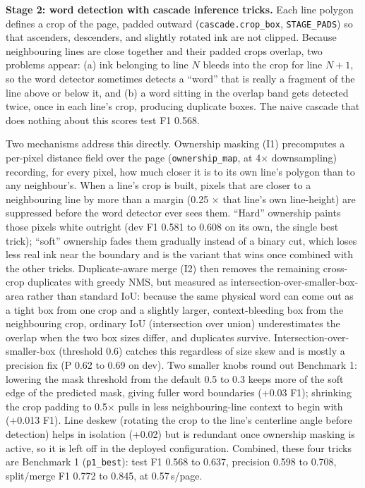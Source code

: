 \documentclass[10.5pt,a4paper]{article}
\begin{document}
\textbf{Stage 2: word detection with cascade inference tricks.} Each line polygon defines a crop of the page, padded outward (\texttt{cascade.crop\_box}, \texttt{STAGE\_PADS}) so that ascenders, descenders, and slightly rotated ink are not clipped. Because neighbouring lines are close together and their padded crops overlap, two problems appear: (a) ink belonging to line $N$ bleeds into the crop for line $N+1$, so the word detector sometimes detects a ``word'' that is really a fragment of the line above or below it, and (b) a word sitting in the overlap band gets detected twice, once in each line's crop, producing duplicate boxes. The naive cascade that does nothing about this scores test F1 0.568.

Two mechanisms address this directly. Ownership masking (I1) precomputes a per-pixel distance field over the page (\texttt{ownership\_map}, at 4$\times$ downsampling) recording, for every pixel, how much closer it is to its own line's polygon than to any neighbour's. When a line's crop is built, pixels that are closer to a neighbouring line by more than a margin (0.25 $\times$ that line's own line-height) are suppressed before the word detector ever sees them. ``Hard'' ownership paints those pixels white outright (dev F1 0.581 to 0.608 on its own, the single best trick); ``soft'' ownership fades them gradually instead of a binary cut, which loses less real ink near the boundary and is the variant that wins once combined with the other tricks. Duplicate-aware merge (I2) then removes the remaining cross-crop duplicates with greedy NMS, but measured as intersection-over-smaller-box-area rather than standard IoU: because the same physical word can come out as a tight box from one crop and a slightly larger, context-bleeding box from the neighbouring crop, ordinary IoU (intersection over union) underestimates the overlap when the two box sizes differ, and duplicates survive. Intersection-over-smaller-box (threshold 0.6) catches this regardless of size skew and is mostly a precision fix (P 0.62 to 0.69 on dev). Two smaller knobs round out Benchmark 1: lowering the mask threshold from the default 0.5 to 0.3 keeps more of the soft edge of the predicted mask, giving fuller word boundaries (+0.03 F1); shrinking the crop padding to 0.5$\times$ pulls in less neighbouring-line context to begin with (+0.013 F1). Line deskew (rotating the crop to the line's centerline angle before detection) helps in isolation (+0.02) but is redundant once ownership masking is active, so it is left off in the deployed configuration. Combined, these four tricks are Benchmark 1 (\texttt{p1\_best}): test F1 0.568 to 0.637, precision 0.598 to 0.708, split/merge F1 0.772 to 0.845, at 0.57\,s/page.
\end{document}
